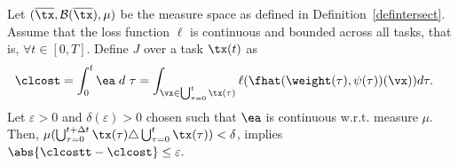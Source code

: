 \begin{lemma}
    Let $(\overline{\tx},\mathcal{B}(\overline{\tx}), \mu)$ be the measure space as 
    defined in Definition~\ref{defintersect}. 
    Assume that the loss function $\ell$ is continuous 
    and bounded across all tasks, that is, $\forall t \in [0,T].$ 
    Define $J$ over a task $\tx(t)$ as
    \begin{align}
        \clcost & =\int_0^t \ea \;  d~\tau  = \int_{\vx\in \bigcup_{\tau=0}^t\tx(\tau)}       \ell(\fhat(\weight(\tau),\psi(\tau))( \vx ) )d\tau . 
    \end{align}
    Let $\varepsilon >0$ and $\delta(\varepsilon)>0$ chosen such that $\ea$ is continuous w.r.t. measure $\mu$.
    Then, 
    $\mu(\bigcup_{\tau = 0}^{t+\Delta t} \tx(\tau)\triangle \bigcup_{\tau = 0}^{t} \tx(\tau))<\delta$, implies
    $\abs{\clcostt- \clcost} \leq \varepsilon.$
\end{lemma}

